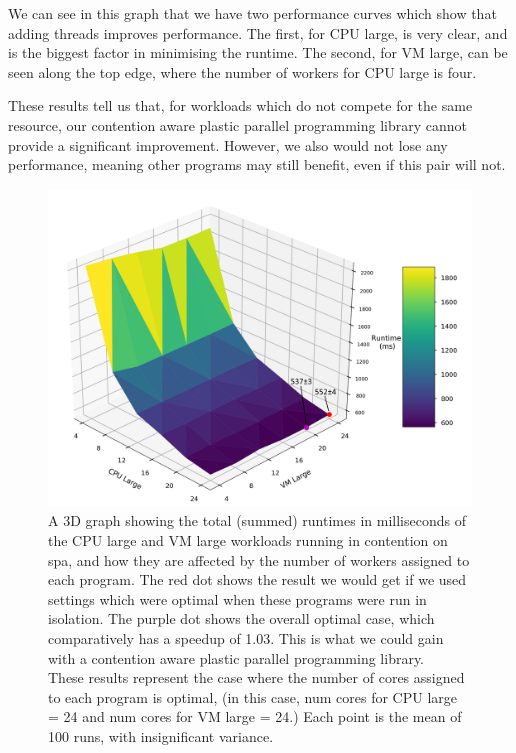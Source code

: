 We can see in this graph that we have two performance curves which show that adding threads improves performance. The first, for CPU large, is very clear, and is the biggest factor in minimising the runtime. The second, for VM large, can be seen along the top edge, where the number of workers for CPU large is four. 

These results tell us that, for workloads which do not compete for the same resource, our contention aware plastic parallel programming library cannot provide a significant improvement. However, we also would not lose any performance, meaning other programs may still benefit, even if this pair will not.



\begin{figure}[H]
    \includegraphics[width=1\textwidth]{graphics/contention/spa/otwc_cpu_large_and_vm_large.png}
    \caption{A 3D graph showing the total (summed) runtimes in milliseconds of the CPU large and VM large workloads running in contention on spa, and how they are affected by the number of workers assigned to each program. The red dot shows the result we would get if we used settings which were optimal when these programs were run in isolation. The purple dot shows the overall optimal case, which comparatively has a speedup of 1.03. This is what we could gain with a contention aware plastic parallel programming library. \\
    These results represent the case where the number of cores assigned to each program is optimal, (in this case, num cores for CPU large = 24 and num cores for VM large = 24.) Each point is the mean of 100 runs, with insignificant variance.}
    \label{fig:con_spa_cpu_large_and_vm_large}
\end{figure}



